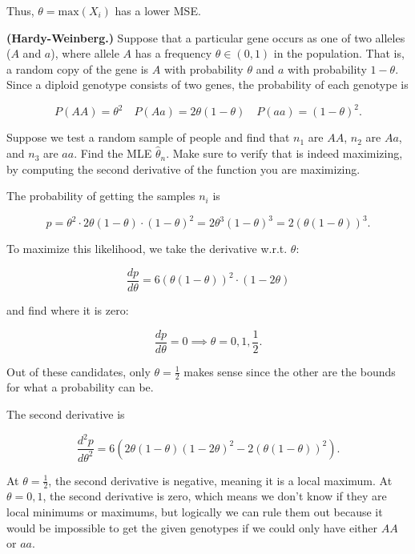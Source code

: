 \documentclass[answers]{exam}
\begin{document}
\begin{questions}
\begin{parts}
\begin{solution}
Thus, $\theta = \text{max}(X_{i})$ has a lower MSE.
\end{solution}
\end{parts}

\question[25] \textbf{(Hardy-Weinberg.)} Suppose that a particular gene occurs
as one of two alleles ($A$ and $a$), where allele $A$ has a frequency $\theta
\in (0,1)$ in the population. That is, a random copy of the gene is $A$ with
probability $\theta$ and $a$ with probability $1-\theta$. Since a diploid
genotype consists of two genes, the probability of each genotype is 

\[
P(AA) = \theta^2 \quad P(Aa) = 2\theta(1-\theta) \quad P(aa) = (1-\theta)^2
.\] 

Suppose we test a random sample of people and find that $n_1$ are $AA$, $n_2$
are $Aa$, and $n_3$ are $aa$. Find the MLE $\hat{\theta}_{n}$. Make sure to
verify that is indeed maximizing, by computing the second derivative of the
function you are maximizing.

\begin{solution}
The probability of getting the samples $n_{i}$ is

\[
p = \theta^2 \cdot 2\theta(1-\theta) \cdot (1-\theta)^2 = 2\theta^3(1-\theta)^3
= 2(\theta(1-\theta))^3
.\] 

To maximize this likelihood, we take the derivative w.r.t. $\theta$:

\[
\frac{dp}{d\theta} = 6(\theta(1-\theta))^2 \cdot (1 - 2\theta)
\] 

and find where it is zero:

\[
\frac{dp}{d\theta} = 0 \implies \theta = 0,1,\frac{1}{2}
.\] 

Out of these candidates, only $\theta = \frac{1}{2}$ makes sense since the other are 
the bounds for what a probability can be.

The second derivative is

\[
\frac{d^2p}{d\theta^2} = 6 \left( 2\theta(1-\theta)(1-2\theta)^2 - 2(\theta(1-\theta))^2 \right)
.\] 

At $\theta=\frac{1}{2}$, the second derivative is negative, meaning it is a
local maximum. At $\theta=0,1$, the second derivative is zero, which means we 
don't know if they are local minimums or maximums, but logically we can rule
them out because it would be impossible to get the given genotypes if we could
only have either $AA$ or $aa$.
\end{solution}
\end{questions}
\end{document}
